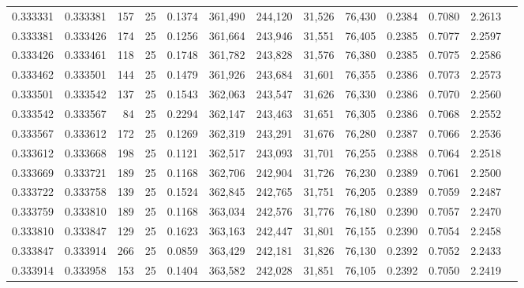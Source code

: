 \begin{tabular}{rrrrrrrrrrrrr}
0.333331 & 0.333381 &   157 &  25 &                                     0.1374 & 361,490 & 244,120 &  31,526 &  76,430 & 0.2384 & 0.7080 & 2.2613 \\
0.333381 & 0.333426 &   174 &  25 &                                     0.1256 & 361,664 & 243,946 &  31,551 &  76,405 & 0.2385 & 0.7077 & 2.2597 \\
0.333426 & 0.333461 &   118 &  25 &                                     0.1748 & 361,782 & 243,828 &  31,576 &  76,380 & 0.2385 & 0.7075 & 2.2586 \\
0.333462 & 0.333501 &   144 &  25 &                                     0.1479 & 361,926 & 243,684 &  31,601 &  76,355 & 0.2386 & 0.7073 & 2.2573 \\
0.333501 & 0.333542 &   137 &  25 &                                     0.1543 & 362,063 & 243,547 &  31,626 &  76,330 & 0.2386 & 0.7070 & 2.2560 \\
0.333542 & 0.333567 &    84 &  25 &                                     0.2294 & 362,147 & 243,463 &  31,651 &  76,305 & 0.2386 & 0.7068 & 2.2552 \\
0.333567 & 0.333612 &   172 &  25 &                                     0.1269 & 362,319 & 243,291 &  31,676 &  76,280 & 0.2387 & 0.7066 & 2.2536 \\
0.333612 & 0.333668 &   198 &  25 &                                     0.1121 & 362,517 & 243,093 &  31,701 &  76,255 & 0.2388 & 0.7064 & 2.2518 \\
0.333669 & 0.333721 &   189 &  25 &                                     0.1168 & 362,706 & 242,904 &  31,726 &  76,230 & 0.2389 & 0.7061 & 2.2500 \\
0.333722 & 0.333758 &   139 &  25 &                                     0.1524 & 362,845 & 242,765 &  31,751 &  76,205 & 0.2389 & 0.7059 & 2.2487 \\
0.333759 & 0.333810 &   189 &  25 &                                     0.1168 & 363,034 & 242,576 &  31,776 &  76,180 & 0.2390 & 0.7057 & 2.2470 \\
0.333810 & 0.333847 &   129 &  25 &                                     0.1623 & 363,163 & 242,447 &  31,801 &  76,155 & 0.2390 & 0.7054 & 2.2458 \\
0.333847 & 0.333914 &   266 &  25 &                                     0.0859 & 363,429 & 242,181 &  31,826 &  76,130 & 0.2392 & 0.7052 & 2.2433 \\
0.333914 & 0.333958 &   153 &  25 &                                     0.1404 & 363,582 & 242,028 &  31,851 &  76,105 & 0.2392 & 0.7050 & 2.2419 \\

\end{tabular}
